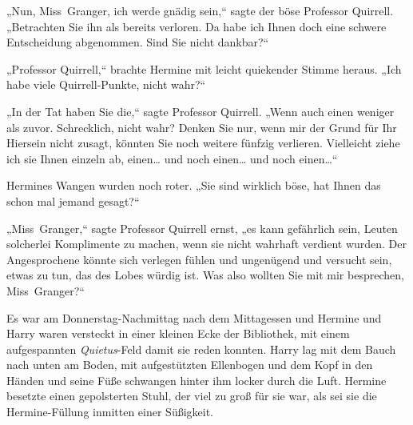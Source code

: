 „Nun, Miss~Granger, ich werde gnädig sein,“ sagte der böse Professor Quirrell. „Betrachten Sie ihn als bereits verloren. Da habe ich Ihnen doch eine schwere Entscheidung abgenommen. Sind Sie nicht dankbar?“

„Professor Quirrell,“ brachte Hermine mit leicht quiekender Stimme heraus. „Ich habe viele Quirrell-Punkte, nicht wahr?“

„In der Tat haben Sie die,“ sagte Professor Quirrell. „Wenn auch einen weniger als zuvor. Schrecklich, nicht wahr? Denken Sie nur, wenn mir der Grund für Ihr Hiersein nicht zusagt, könnten Sie noch weitere fünfzig verlieren. Vielleicht ziehe ich sie Ihnen einzeln ab, einen… und noch einen… und noch einen…“

Hermines Wangen wurden noch roter. „Sie sind wirklich böse, hat Ihnen das schon mal jemand gesagt?“

„Miss~Granger,“ sagte Professor Quirrell ernst, „es kann gefährlich sein, Leuten solcherlei Komplimente zu machen, wenn sie nicht wahrhaft verdient wurden. Der Angesprochene könnte sich verlegen fühlen und ungenügend und versucht sein, etwas zu tun, das des Lobes würdig ist. Was also wollten Sie mit mir besprechen, Miss~Granger?“

\later

Es war am Donnerstag-Nachmittag nach dem Mittagessen und Hermine und Harry waren versteckt in einer kleinen Ecke der Bibliothek, mit einem aufgespannten \emph{Quietus}-Feld damit sie reden konnten. Harry lag mit dem Bauch nach unten am Boden, mit aufgestützten Ellenbogen und dem Kopf in den Händen und seine Füße schwangen hinter ihm locker durch die Luft. Hermine besetzte einen gepolsterten Stuhl, der viel zu groß für sie war, als sei sie die Hermine-Füllung inmitten einer Süßigkeit.


